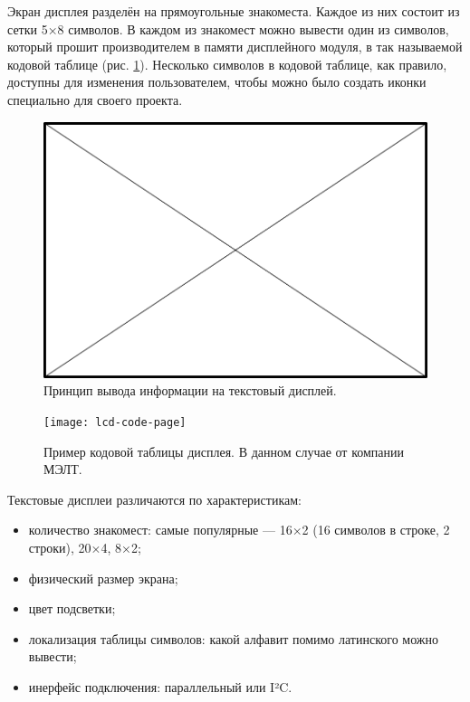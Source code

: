 Экран дисплея разделён на прямоугольные знакоместа. Каждое из них состоит из сетки 5×8 символов. В каждом из знакомест можно вывести один из символов, который прошит производителем в памяти дисплейного модуля, в так называемой кодовой таблице (рис. \ref{fig:text-lcd-code-page}). Несколько символов в кодовой таблице, как правило, доступны для изменения пользователем, чтобы можно было создать иконки специально для своего проекта.

\begin{figure}
  \centering
  \includegraphics{TODO}
  \caption{Принцип вывода информации на текстовый дисплей.}
\end{figure}

\begin{figure}
  \centering
  \texttt{[image: lcd-code-page]}
  \caption{Пример кодовой таблицы дисплея. В данном случае от компании МЭЛТ.}
  \label{fig:text-lcd-code-page}
\end{figure}

Текстовые дисплеи различаются по характеристикам:

\begin{itemize}
  \item количество знакомест: самые популярные — 16×2 (16 символов в строке, 2 строки), 20×4, 8×2;
  \item физический размер экрана;
  \item цвет подсветки;
  \item локализация таблицы символов: какой алфавит помимо латинского можно вывести;
  \item инерфейс подключения: параллельный или I²C.
\end{itemize}

